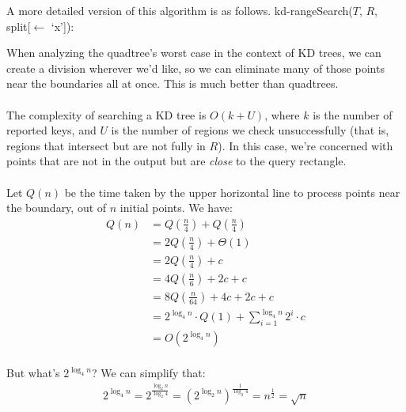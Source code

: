 \documentclass[]{article}
\theoremstyle{definition}
\begin{document}
			A more detailed version of this algorithm is as follows. kd-rangeSearch($T$, $R$, split[$\leftarrow$ `x']): \\
			\begin{algorithm}[H]
			\end{algorithm}

			When analyzing the quadtree's worst case in the context of KD trees, we can create a division wherever we'd like, so we can eliminate many of those points near the boundaries all at once. This is much better than quadtrees.
			\\ \\
			The complexity of searching a KD tree is $O(k + U)$, where $k$ is the number of reported keys, and $U$ is the number of regions we check unsuccessfully (that is, regions that intersect but are not fully in $R$). In this case, we're concerned with points that are not in the output but are \emph{close} to the query rectangle.
			\\ \\
			Let $Q(n)$ be the time taken by the upper horizontal line to process points near the boundary, out of $n$ initial points. We have:
			\begin{align*}
				Q(n) &= Q\left( \frac{n}{4} \right) + Q\left( \frac{n}{4} \right) \\
				&= 2Q\left( \frac{n}{4} \right) + \Theta(1) \\
				&= 2Q\left( \frac{n}{4} \right) + c \\
				&= 4Q\left( \frac{n}{6} \right) + 2c + c \\
				&= 8Q\left( \frac{n}{64} \right) + 4c + 2c + c \\
				&= 2^{\log_4 n} \cdot Q(1) + \sum_{i = 1}^{\log_4 n} 2^i \cdot c \\
				&= O(2^{\log_4 n}) \\
			\end{align*}

			But what's $2^{\log_4 n}$? We can simplify that:
			\begin{align*}
				2^{\log_4 n} = 2^{\frac{\log_2 n}{\log_2 4}} = \left(2^{\log_2 n} \right)^{\frac{1}{\log_2 4}} = n^{\frac{1}{2}} = \sqrt{n}
			\end{align*}
\end{document}
